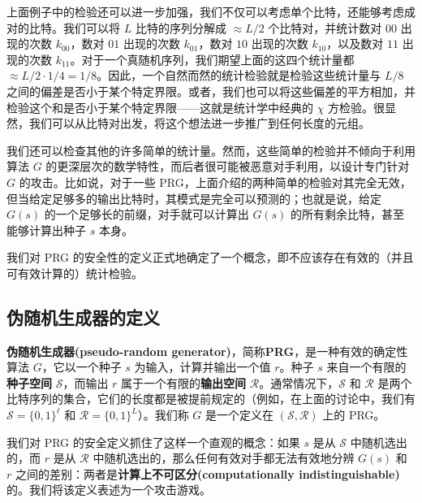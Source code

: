 上面例子中的检验还可以进一步加强，我们不仅可以考虑单个比特，还能够考虑成对的比特。我们可以将 $L$ 比特的序列分解成 $\approx L/2$ 个比特对，并统计数对 $00$ 出现的次数 $k_{00}$，数对 $01$ 出现的次数 $k_{01}$，数对 $10$ 出现的次数 $k_{10}$，以及数对 $11$ 出现的次数 $k_{11}$。对于一个真随机序列，我们期望上面的这四个统计量都 $\approx L/2\cdot 1/4=1/8$。因此，一个自然而然的统计检验就是检验这些统计量与 $L/8$ 之间的偏差是否小于某个特定界限。或者，我们也可以将这些偏差的平方相加，并检验这个和是否小于某个特定界限——这就是统计学中经典的 $\chi$ 方检验。很显然，我们可以从比特对出发，将这个想法进一步推广到任何长度的元组。

我们还可以检查其他的许多简单的统计量。然而，这些简单的检验并不倾向于利用算法 $G$ 的更深层次的数学特性，而后者很可能被恶意对手利用，以设计专门针对 $G$ 的攻击。比如说，对于一些 PRG，上面介绍的两种简单的检验对其完全无效，但当给定足够多的输出比特时，其模式是完全可以预测的；也就是说，给定 $G(s)$ 的一个足够长的前缀，对手就可以计算出 $G(s)$ 的所有剩余比特，甚至能够计算出种子 $s$ 本身。

我们对 PRG 的安全性的定义正式地确定了一个概念，即不应该存在有效的（并且可有效计算的）统计检验。

\subsection{伪随机生成器的定义}

\textbf{伪随机生成器(pseudo-random generator)}，简称\textbf{PRG}，是一种有效的确定性算法 $G$，它以一个种子 $s$ 为输入，计算并输出一个值 $r$。种子 $s$ 来自一个有限的\textbf{种子空间} $\mathcal{S}$，而输出 $r$ 属于一个有限的\textbf{输出空间} $\mathcal{R}$。通常情况下，$\mathcal{S}$ 和 $\mathcal{R}$ 是两个比特序列的集合，它们的长度都是被提前规定的（例如，在上面的讨论中，我们有 $\mathcal{S}=\{0,1\}^\ell$ 和 $\mathcal{R}=\{0,1\}^L$）。我们称 $G$ 是一个定义在 $(\mathcal{S},\mathcal{R})$ 上的 PRG。

我们对 PRG 的安全定义抓住了这样一个直观的概念：如果 $s$ 是从 $\mathcal{S}$ 中随机选出的，而 $r$ 是从 $\mathcal{R}$ 中随机选出的，那么任何有效对手都无法有效地分辨 $G(s)$ 和 $r$ 之间的差别：两者是\textbf{计算上不可区分(computationally indistinguishable)}的。我们将该定义表述为一个攻击游戏。


